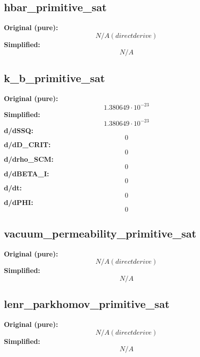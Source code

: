 \subsection{hbar_primitive_sat}
\textbf{Original (pure):}
\begin{equation}
N/A (direct derive)
\end{equation}
\textbf{Simplified:}
\begin{equation}
N/A
\end{equation}

\subsection{k_b_primitive_sat}
\textbf{Original (pure):}
\begin{equation}
1.380649 \cdot 10^{-23}
\end{equation}
\textbf{Simplified:}
\begin{equation}
1.380649 \cdot 10^{-23}
\end{equation}
\textbf{d/dSSQ:}
\begin{equation}
0
\end{equation}
\textbf{d/dD_CRIT:}
\begin{equation}
0
\end{equation}
\textbf{d/drho_SCM:}
\begin{equation}
0
\end{equation}
\textbf{d/dBETA_I:}
\begin{equation}
0
\end{equation}
\textbf{d/dt:}
\begin{equation}
0
\end{equation}
\textbf{d/dPHI:}
\begin{equation}
0
\end{equation}

\subsection{vacuum_permeability_primitive_sat}
\textbf{Original (pure):}
\begin{equation}
N/A (direct derive)
\end{equation}
\textbf{Simplified:}
\begin{equation}
N/A
\end{equation}

\subsection{lenr_parkhomov_primitive_sat}
\textbf{Original (pure):}
\begin{equation}
N/A (direct derive)
\end{equation}
\textbf{Simplified:}
\begin{equation}
N/A
\end{equation}

